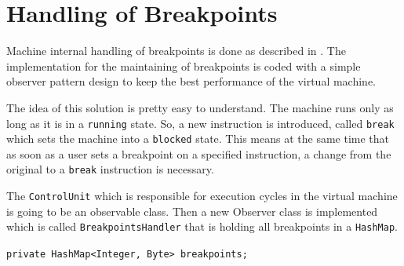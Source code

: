 \section{Handling of Breakpoints}
Machine internal handling of breakpoints is done as described in \cite{bendersky_how_nodate}. The implementation for the maintaining of breakpoints is coded with a simple observer pattern design to keep the best performance of the virtual machine. 

The idea of this solution is pretty easy to understand. The machine runs only as long as it is in a \lstinline$running$ state. So, a new instruction is introduced, called \lstinline$break$ which sets the machine into a \lstinline$blocked$ state. This means at the same time that as soon as a user sets a breakpoint on a specified instruction, a change from the original to a \lstinline$break$ instruction is necessary.

The \lstinline$ControlUnit$ which is responsible for execution cycles in the virtual machine is going to be an observable class. Then a new Observer class is implemented which is called \lstinline$BreakpointsHandler$ that is holding all breakpoints in a \lstinline$HashMap$.

\lstinline$private HashMap<Integer, Byte> breakpoints;$
 
